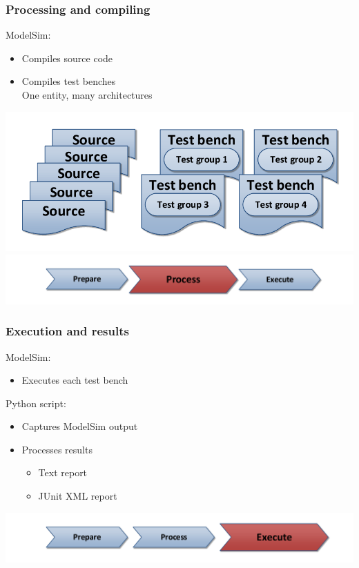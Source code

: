 \documentclass[british,10pt]{beamer}
\begin{document}
\begin{frame}\frametitle{Processing and compiling}
\vskip40pt
ModelSim:
\begin{itemize}
\item Compiles source code
\item Compiles test benches\\
\hskip2pt One entity, many architectures
\end{itemize}
\centering
\includegraphics[width=.75\textwidth]{images/sources.pdf}
\vskip10pt
\includegraphics[width=.7\textwidth]{images/ppe2.pdf}
\end{frame}


\begin{frame}\frametitle{Execution and results}
\vskip48pt
ModelSim:
\begin{itemize}
\item Executes each test bench
\end{itemize}
\vskip5pt
Python script:
\begin{itemize}
\item Captures ModelSim output
\item Processes results
\begin{itemize}
\item Text report
\item JUnit XML report
\end{itemize}
\end{itemize}
\centering
\vskip48pt
\includegraphics[width=.7\textwidth]{images/ppe3.pdf}
\end{frame}
\end{document}
